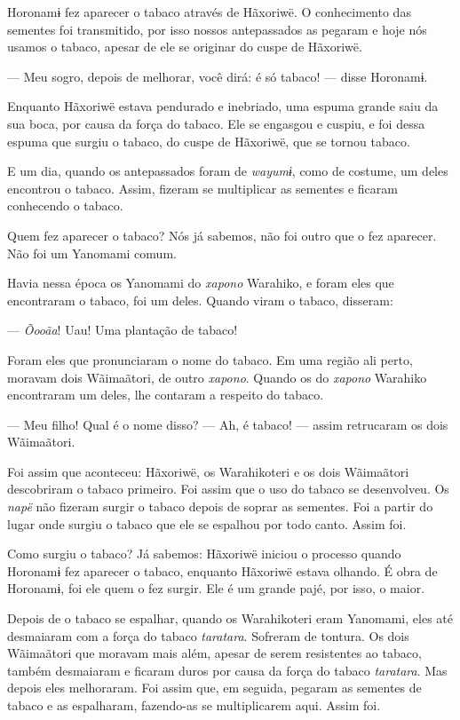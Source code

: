 Horonamɨ fez aparecer o tabaco através de Hãxoriwë. O conhecimento das sementes foi transmitido, por isso nossos antepassados as pegaram e hoje nós usamos o tabaco, apesar de ele se originar do cuspe de Hãxoriwë. 

--- Meu sogro, depois de melhorar, você dirá: é só tabaco! --- disse
Horonamɨ. 

Enquanto Hãxoriwë estava pendurado e inebriado, uma espuma grande saiu
da sua boca, por causa da força do tabaco. Ele se engasgou e cuspiu, e
foi dessa espuma que surgiu o tabaco, do cuspe de Hãxoriwë, que se tornou
tabaco. 

E um dia, quando os antepassados foram de \textit{wayumɨ}, como de
costume, um deles encontrou o tabaco. Assim, fizeram se multiplicar as
sementes e ficaram conhecendo o tabaco. 

Quem fez aparecer o tabaco? Nós já sabemos, não foi outro que o fez
aparecer. Não foi um Yanomami comum. 

Havia nessa época os Yanomami do \textit{xapono} Warahiko, e foram eles
que encontraram o tabaco, foi um deles. Quando viram o tabaco,
disseram: 

--- \textit{Õooãa}! Uau! Uma plantação de tabaco! 

Foram eles que pronunciaram o nome do tabaco. Em uma região
ali perto, moravam dois Wãimaãtori, de outro \textit{xapono}. Quando os do
\textit{xapono} Warahiko encontraram um deles, lhe contaram a respeito do
tabaco. 

--- Meu filho! Qual é o nome disso? 
--- Ah, é tabaco! --- assim retrucaram os dois Wãimaãtori. 

Foi assim que aconteceu: Hãxoriwë, os Warahikoteri e os dois Wãimaãtori
descobriram o tabaco primeiro. Foi assim que o uso do tabaco se
desenvolveu. Os \textit{napë} não fizeram surgir o tabaco depois de soprar
as sementes. Foi a partir do lugar onde surgiu o tabaco que ele se
espalhou por todo canto. Assim foi. 

Como surgiu o tabaco? Já sabemos: Hãxoriwë iniciou o processo quando
Horonamɨ fez aparecer o tabaco, enquanto Hãxoriwë estava olhando. É obra
de Horonamɨ, foi ele quem o fez surgir. Ele é um grande pajé, por isso,
o maior. 

Depois de o tabaco se espalhar, quando os Warahikoteri eram Yanomami,
eles até desmaiaram com a força do tabaco \textit{taratara}. Sofreram de
tontura. Os dois Wãimaãtori que moravam mais além, apesar de serem
resistentes ao tabaco, também desmaiaram e ficaram duros por causa da
força do tabaco \textit{taratara}. Mas depois eles melhoraram. Foi assim
que, em seguida, pegaram as sementes de tabaco e as espalharam,
fazendo-as se multiplicarem aqui. Assim foi.

